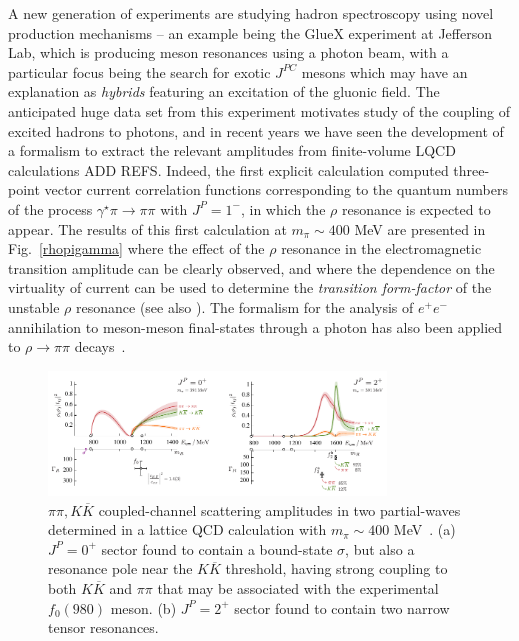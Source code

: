 A new generation of experiments are studying hadron spectroscopy using novel production mechanisms -- an example being the GlueX experiment at Jefferson Lab, which is producing meson resonances using a photon beam, with a particular focus being the search for exotic $J^{PC}$  mesons which may have an explanation as \emph{hybrids} featuring an excitation of the gluonic field. The anticipated huge data set from this experiment motivates study of the coupling of excited hadrons to photons, and in recent years we have seen the development of a formalism to extract the relevant amplitudes from finite-volume LQCD calculations \cite{} {\color{red} ADD REFS}. Indeed, the first explicit calculation \cite{Briceno:2015dca,Briceno:2016kkp} computed three-point vector current correlation functions corresponding to the quantum numbers of the process $\gamma^\star \pi \to \pi \pi$ with $J^P=1^-$, in which the $\rho$ resonance is expected to appear. The results of this first calculation at $m_\pi \sim 400$ MeV are presented in Fig.~\ref{rhopigamma} where the effect of the $\rho$ resonance in the electromagnetic transition amplitude can be clearly observed, and where the dependence on the virtuality of current can be used to determine the \emph{transition form-factor} of the unstable $\rho$ resonance (see also \cite{Alexandrou:2018jbt}). The formalism for the analysis of  $e^+ e^-$ annihilation to meson-meson final-states through a photon has also been applied to $\rho \to \pi\pi$ decays~\cite{Feng:2014gba}.

 
\begin{figure}
\includegraphics[width=0.8\textwidth]{figures/f0f2}
\caption{$\pi\pi, K\overline{K}$ coupled-channel scattering amplitudes in two partial-waves determined in a lattice QCD calculation with $m_\pi \sim 400$ MeV~\cite{Briceno:2017qmb}. (a) $J^P=0^+$ sector found to contain a bound-state $\sigma$, but also a resonance pole near the $K\overline{K}$ threshold, having strong coupling to both $K\overline{K}$ and $\pi\pi$ that may be associated with the experimental $f_0(980)$ meson. (b) $J^P=2^+$ sector found to contain two narrow tensor resonances.}
\label{f0f2}
\end{figure}


